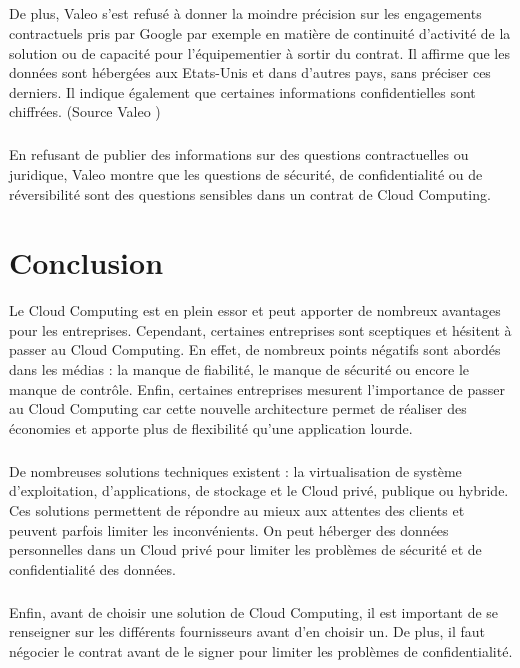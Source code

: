 \documentclass[a4paper,12pt]{report}
\begin{document}
\begin{onehalfspace}
	\paragraph*{}
	De plus, Valeo s'est refusé à donner la moindre précision sur les engagements contractuels pris par Google par exemple en matière de continuité d'activité de la solution ou de capacité pour l'équipementier à sortir du contrat. Il affirme que les données sont hébergées aux Etats-Unis et dans d’autres pays, sans préciser ces derniers. Il indique également que certaines informations confidentielles sont chiffrées. (Source Valeo \cite{source:valeo})
	\paragraph*{}
	En refusant de publier des informations sur des questions contractuelles ou juridique, Valeo montre que les questions de sécurité, de confidentialité ou de réversibilité sont des questions sensibles dans un contrat de Cloud Computing.

	\chapter*{Conclusion}

Le Cloud Computing est en plein essor et peut apporter de nombreux avantages pour les entreprises. Cependant, certaines entreprises sont sceptiques et hésitent à passer au Cloud Computing. En effet, de nombreux points négatifs sont abordés dans les médias : la manque de fiabilité, le manque de sécurité ou encore le manque de contrôle. Enfin, certaines entreprises mesurent l'importance de passer au Cloud Computing car cette nouvelle architecture permet de réaliser des économies et apporte plus de flexibilité qu’une application lourde.
\paragraph*{}
De nombreuses solutions techniques existent : la virtualisation de système d’exploitation, d’applications, de stockage et le Cloud privé, publique ou hybride. Ces solutions permettent de répondre au mieux aux attentes des clients et peuvent parfois limiter les inconvénients. On peut héberger des données personnelles dans un Cloud privé pour limiter les problèmes de sécurité et de confidentialité des données.
\paragraph*{}
Enfin, avant de choisir une solution de Cloud Computing, il est important de se renseigner sur les différents fournisseurs avant d’en choisir un. De plus, il faut négocier le contrat avant de le signer pour limiter les problèmes de confidentialité. 
	


\end{onehalfspace}
\end{document}
